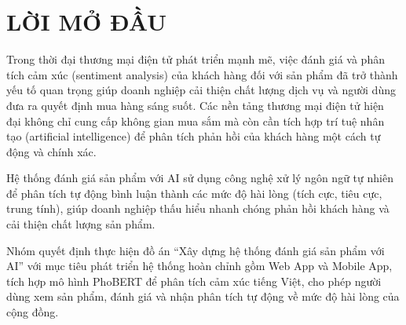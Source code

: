 
\newpage



\section*{\textbf{LỜI MỞ ĐẦU}}
{}
Trong thời đại thương mại điện tử phát triển mạnh mẽ, việc đánh giá và phân tích cảm xúc (sentiment analysis) của khách hàng đối với sản phẩm đã trở thành yếu tố quan trọng giúp doanh nghiệp cải thiện chất lượng dịch vụ và người dùng đưa ra quyết định mua hàng sáng suốt. Các nền tảng thương mại điện tử hiện đại không chỉ cung cấp không gian mua sắm mà còn cần tích hợp trí tuệ nhân tạo (artificial intelligence) để phân tích phản hồi của khách hàng một cách tự động và chính xác.

Hệ thống đánh giá sản phẩm với AI sử dụng công nghệ xử lý ngôn ngữ tự nhiên để phân tích tự động bình luận thành các mức độ hài lòng (tích cực, tiêu cực, trung tính), giúp doanh nghiệp thấu hiểu nhanh chóng phản hồi khách hàng và cải thiện chất lượng sản phẩm.

Nhóm quyết định thực hiện đồ án ``Xây dựng hệ thống đánh giá sản phẩm với AI'' với mục tiêu phát triển hệ thống hoàn chỉnh gồm Web App và Mobile App, tích hợp mô hình PhoBERT để phân tích cảm xúc tiếng Việt, cho phép người dùng xem sản phẩm, đánh giá và nhận phân tích tự động về mức độ hài lòng của cộng đồng.

